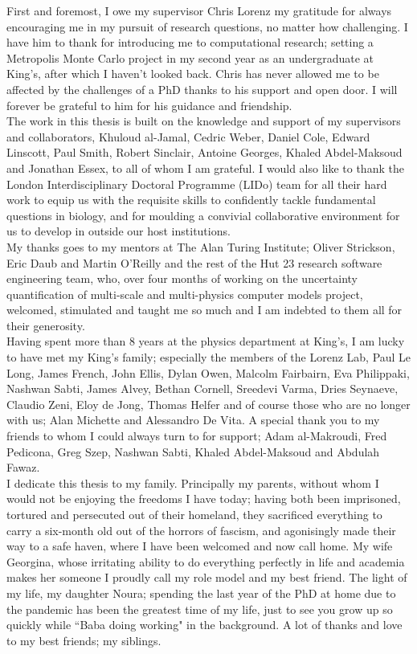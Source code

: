 \begin{acknowledgements}
First and foremost, I owe my supervisor Chris Lorenz my gratitude for always encouraging me in my pursuit of research questions, no matter how challenging. I have him to thank for introducing me to computational research; setting a Metropolis Monte Carlo project in my second year as an undergraduate at King's, after which I haven't looked back. Chris has never allowed me to be affected by the challenges of a PhD thanks to his support and open door. I will forever be grateful to him for his guidance and friendship.\\

The work in this thesis is built on the knowledge and support of my supervisors and collaborators, Khuloud al-Jamal, Cedric Weber, Daniel Cole, Edward Linscott, Paul Smith, Robert Sinclair, Antoine Georges, Khaled Abdel-Maksoud and Jonathan Essex, to all of whom I am grateful. I would also like to thank the London Interdisciplinary Doctoral Programme (LIDo) team for all their hard work to equip us with the requisite skills to confidently tackle fundamental questions in biology, and for moulding a convivial collaborative environment for us to develop in outside our host institutions.\\
\clearpage
My thanks goes to my mentors at The Alan Turing Institute; Oliver Strickson, Eric Daub and Martin O'Reilly and the rest of the Hut 23 research software engineering team, who, over four months of working on the uncertainty quantification of multi-scale and multi-physics computer models project, welcomed, stimulated and taught me so much and I am indebted to them all for their generosity.\\

Having spent more than 8 years at the physics department at King's, I am lucky to have met my King's family; especially the members of the Lorenz Lab, Paul Le Long, James French, John Ellis, Dylan Owen, Malcolm Fairbairn, Eva Philippaki, Nashwan Sabti, James Alvey, Bethan Cornell, Sreedevi Varma, Dries Seynaeve, Claudio Zeni, Eloy de Jong, Thomas Helfer and of course those who are no longer with us; Alan Michette and Alessandro De Vita. A special thank you to my friends to whom I could always turn to for support; Adam al-Makroudi, Fred Pedicona, Greg Szep, Nashwan Sabti, Khaled Abdel-Maksoud and Abdulah Fawaz.\\

I dedicate this thesis to my family. Principally my parents, without whom I would not be enjoying the freedoms I have today; having both been imprisoned, tortured and persecuted out of their homeland, they sacrificed everything to carry a six-month old out of the horrors of fascism, and agonisingly made their way to a safe haven, where I have been welcomed and now call home. My wife Georgina, whose irritating ability to do everything perfectly in life and academia makes her someone I proudly call my role model and my best friend. The light of my life, my daughter Noura; spending the last year of the PhD at home due to the pandemic has been the greatest time of my life, just to see you grow up so quickly while ``Baba doing working" in the background. A lot of thanks and love to my best friends; my siblings. 


\end{acknowledgements}
